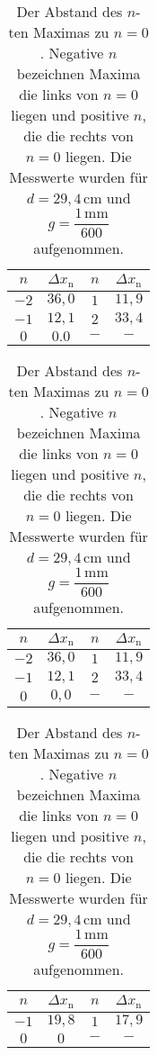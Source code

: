 \begin{table}[H]
    \centering
    \caption{Der Abstand des $n$-ten Maximas zu $n = 0$. Negative $n$ bezeichnen Maxima die links von $n = 0$ liegen und positive $n$, die die rechts von $n = 0$ liegen. Die Messwerte wurden für $d = 29,4 \, \unit{\centi\meter}$ und $g = \dfrac{1 \, \unit{\milli\meter}}{600}$ aufgenommen.}
    \label{tab:Well_600}
    \begin{tabular}{c c c c}
    \toprule
     $n$ & $\Delta x_\text{n}$ &   $n$ & $\Delta x_\text{n}$\\
    \midrule
    $-2$ & $36,0$ & $1$ & $ 11,9$ \\
    $-1$ & $12,1$ & $2$ & $ 33,4$ \\
    $0$ & $ 0.0$  & $- $ & $ - $\\
   \bottomrule
    \end{tabular}
    \end{table}
\begin{table}[H]
    \centering
    \caption{Der Abstand des $n$-ten Maximas zu $n = 0$. Negative $n$ bezeichnen Maxima die links von $n = 0$ liegen und positive $n$, die die rechts von $n = 0$ liegen. Die Messwerte wurden für $d = 29,4 \, \unit{\centi\meter}$ und $g = \dfrac{1 \, \unit{\milli\meter}}{600}$ aufgenommen.}
    \label{tab:Well_600}
    \begin{tabular}{c c c c}
    \toprule
     $n$ & $\Delta x_\text{n}$ &   $n$ & $\Delta x_\text{n}$\\
    \midrule
    $-2$ & $36,0$ & $1$ & $ 11,9$ \\
    $-1$ & $12,1$ & $2$ & $ 33,4$ \\
    $ 0$ & $ 0,0$ & $-$ & $ -   $\\
   \bottomrule
    \end{tabular}
    \end{table}
\begin{table}[H]
    \centering
    \caption{Der Abstand des $n$-ten Maximas zu $n = 0$. Negative $n$ bezeichnen Maxima die links von $n = 0$ liegen und positive $n$, die die rechts von $n = 0$ liegen. Die Messwerte wurden für $d = 29,4 \, \unit{\centi\meter}$ und $g = \dfrac{1 \, \unit{\milli\meter}}{600}$ aufgenommen.}
    \label{tab:Well_1200}
    \begin{tabular}{c c c c}
    \toprule
     $n$ & $\Delta x_\text{n}$ &   $n$ & $\Delta x_\text{n}$\\
    \midrule
    $-1$ & $19,8$   & $1$ & $ 17,9$   \\
    $0$  & $0   $   & $-$ & $ -   $   \\
    \bottomrule
    \end{tabular}
    \end{table}

